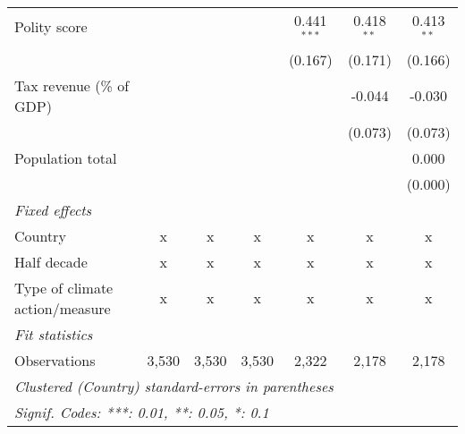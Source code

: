 \begin{tabular}{lcccccc}
   Polity score                                                                     &         &         &               & 0.441$^{***}$ & 0.418$^{**}$ & 0.413$^{**}$\\   
                                                                                    &         &         &               & (0.167)       & (0.171)      & (0.166)\\   
   Tax revenue (\% of GDP)                                                          &         &         &               &               & -0.044       & -0.030\\   
                                                                                    &         &         &               &               & (0.073)      & (0.073)\\   
   Population total                                                                 &         &         &               &               &              & 0.000\\   
                                                                                    &         &         &               &               &              & (0.000)\\   
   \emph{Fixed effects}\\
   Country                                                                          & x       & x       & x             & x             & x            & x\\  
   Half decade                                                                      & x       & x       & x             & x             & x            & x\\  
   Type of climate action/measure                                                   & x       & x       & x             & x             & x            & x\\  
   \midrule \emph{Fit statistics}\\
   Observations                                                                     & 3,530   & 3,530   & 3,530         & 2,322         & 2,178        & 2,178\\  
   \midrule
   \multicolumn{7}{l}{\emph{Clustered (Country) standard-errors in parentheses}}\\
   \multicolumn{7}{l}{\emph{Signif. Codes: ***: 0.01, **: 0.05, *: 0.1}}\\
\end{tabular}
\par\endgroup


